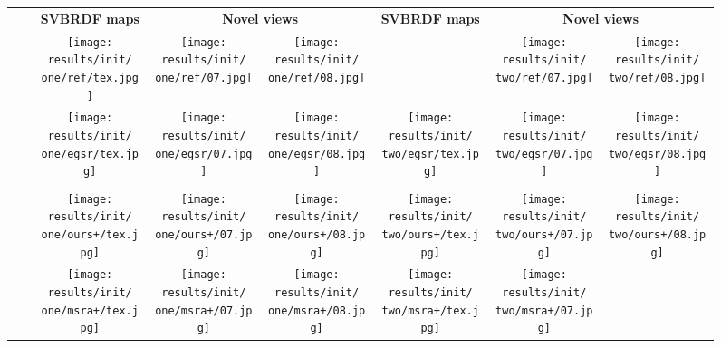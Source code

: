 \renewcommand{\one}{fake_030}
\renewcommand{\two}{real_other-bamboo-veawe}

\setlength{\resLen}{0.556in}
\begin{figure*}[tbhp]
	\addtolength{\tabcolsep}{-4pt}
	\begin{tabular}{lcccc@{\hspace{2\tabcolsep}}ccc}
		& & \textbf{\small SVBRDF maps} &
		\multicolumn{2}{c}{\textbf{\small Novel views}}
		& \textbf{\small SVBRDF maps} & 
		\multicolumn{2}{c}{\textbf{\small Novel views}}
		\\
		& \raisebox{.25in}{\rotatebox[origin=c]{90}{\footnotesize{GT}}} &
		\texttt{[image: results/init/\\one/ref/tex.jpg]} &
		\texttt{[image: results/init/\\one/ref/07.jpg]} &
		\texttt{[image: results/init/\\one/ref/08.jpg]} &
		 &
		\texttt{[image: results/init/\\two/ref/07.jpg]} &
		\texttt{[image: results/init/\\two/ref/08.jpg]}
		\\
		& \raisebox{.25in}{\rotatebox[origin=c]{90}{\footnotesize{[Deschaintre]}}} &
		\texttt{[image: results/init/\\one/egsr/tex.jpg]} &
		\texttt{[image: results/init/\\one/egsr/07.jpg]} &
		\texttt{[image: results/init/\\one/egsr/08.jpg]} &
		\texttt{[image: results/init/\\two/egsr/tex.jpg]} &
		\texttt{[image: results/init/\\two/egsr/07.jpg]} &
		\texttt{[image: results/init/\\two/egsr/08.jpg]}
		\\
		\hline\\[-8pt]
		\multirow{2}{*}[1em]{\rotatebox[origin=c]{90}{\footnotesize\bfseries Constant init.}} &
		\raisebox{.25in}{\rotatebox[origin=c]{90}{\footnotesize{Ours}}} &
		\texttt{[image: results/init/\\one/ours+/tex.jpg]} &
		\texttt{[image: results/init/\\one/ours+/07.jpg]} &
		\texttt{[image: results/init/\\one/ours+/08.jpg]} &
		\texttt{[image: results/init/\\two/ours+/tex.jpg]} &
		\texttt{[image: results/init/\\two/ours+/07.jpg]} &
		\texttt{[image: results/init/\\two/ours+/08.jpg]}
		\\
		& \raisebox{.25in}{\rotatebox[origin=c]{90}{\footnotesize{[Gao19]}}} &
		\texttt{[image: results/init/\\one/msra+/tex.jpg]} &
		\texttt{[image: results/init/\\one/msra+/07.jpg]} &
		\texttt{[image: results/init/\\one/msra+/08.jpg]} &
		\texttt{[image: results/init/\\two/msra+/tex.jpg]} &
		\texttt{[image: results/init/\\two/msra+/07.jpg]} &

\end{tabular}
\end{figure*}
